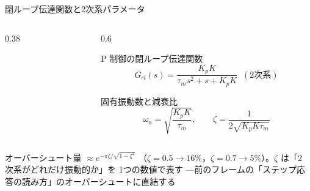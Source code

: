 \begin{frame}{閉ループ伝達関数と2次系パラメータ}
  \begin{columns}[c]
    \begin{column}{0.38\textwidth}
      \centering
    \end{column}
    \begin{column}{0.6\textwidth}
      \begin{block}{P 制御の閉ループ伝達関数}
        \setlength{\abovedisplayskip}{2pt}\setlength{\belowdisplayskip}{2pt}%
        \[
          G_{cl}(s) = \frac{K_p K}{\tau_m s^2 + s + K_p K} \;\; (\text{2次系})
        \]
      \end{block}

      \begin{block}{固有振動数と減衰比}
        \setlength{\abovedisplayskip}{2pt}\setlength{\belowdisplayskip}{2pt}%
        \[
          \omega_n = \sqrt{\frac{K_p K}{\tau_m}}, \qquad
          \zeta = \frac{1}{2\sqrt{K_p K \tau_m}}
        \]
      \end{block}
    \end{column}
  \end{columns}

  \vspace{0.1em}

  {\footnotesize オーバーシュート量 $\approx e^{-\pi\zeta/\sqrt{1-\zeta^2}}$
  （$\zeta=0.5\to16\%$，$\zeta=0.7\to5\%$）。$\zeta$ は「2 次系がどれだけ振動的か」を
  1つの数値で表す ---前のフレームの「ステップ応答の読み方」のオーバーシュートに直結する}
\end{frame}

